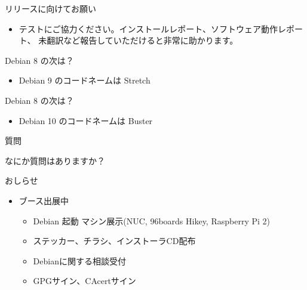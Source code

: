 \begin{frame}{リリースに向けてお願い}
\begin{itemize}
\item テストにご協力ください。インストールレポート、ソフトウェア動作レポート、
未翻訳など報告していただけると非常に助かります。
\end{itemize}

\end{frame}


\begin{frame}{Debian 8 の次は？}
\begin{itemize}
\item Debian 9 のコードネームは Stretch
\end{itemize}


\end{frame}

\begin{frame}{Debian 8 の次は？}
  \begin{itemize}
  \item Debian 10 のコードネームは Buster
  \end{itemize}


\end{frame}

\begin{frame}[containsverbatim]{質問}

\begin{center}
なにか質問はありますか？
\end{center}

\end{frame}

\begin{frame}{おしらせ}
\begin{itemize}
\item ブース出展中
\begin{itemize}
\item Debian 起動 マシン展示(NUC, 96boards Hikey, Raspberry Pi 2)
\item ステッカー、チラシ、インストーラCD配布
\item Debianに関する相談受付
\item GPGサイン、CAcertサイン
\end{itemize}
\end{itemize}

\end{frame}

